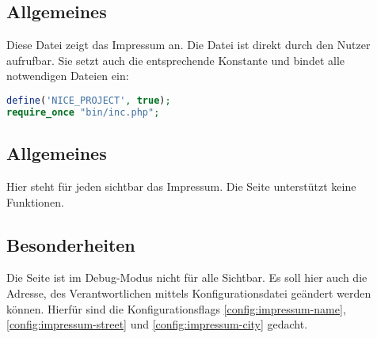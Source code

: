 \subsection{Allgemeines} Diese Datei zeigt das Impressum an.
Die Datei ist direkt durch den Nutzer aufrufbar. Sie setzt auch die entsprechende Konstante und bindet alle notwendigen Dateien ein:
\begin{lstlisting}[language=php]
define('NICE_PROJECT', true);
require_once "bin/inc.php";
\end{lstlisting}
\subsection{Allgemeines}
Hier steht für jeden sichtbar das Impressum. Die Seite unterstützt keine Funktionen.
\subsection{Besonderheiten}
Die Seite ist im Debug-Modus nicht für alle Sichtbar. Es soll hier auch die Adresse, des Verantwortlichen mittels Konfigurationsdatei geändert werden können. Hierfür sind die Konfigurationsflags \autoref{config:impressum-name}, \autoref{config:impressum-street} und \autoref{config:impressum-city} gedacht.
